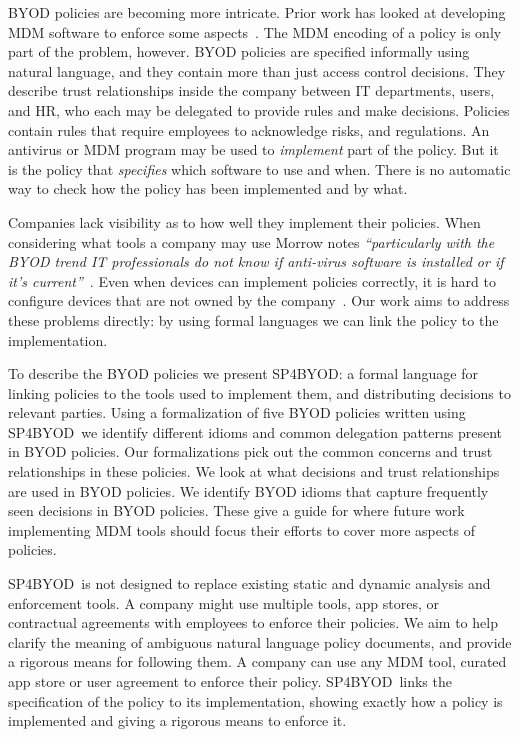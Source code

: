 \documentclass{llncs}
\newcommand{\AppPAL}[0]{SP4BYOD}
\begin{document}
BYOD policies are becoming more intricate.
Prior work has looked at developing \ac{MDM} software to enforce some aspects~\cite{costantino_towards_2013,martinelli_enhancing_2016,armando_enabling_2014}.
The \ac{MDM} encoding of a policy is only part of the problem, however.
BYOD policies are specified informally using natural language, and they contain more than just access control decisions.
They describe trust relationships inside the company between IT departments, users, and HR, who each may be delegated to provide rules and make decisions.
Policies contain rules that require employees to acknowledge risks, and regulations.
An antivirus or \ac{MDM} program may be used to \emph{implement} part of the policy.
But it is the policy that \emph{specifies} which software to use and when. 
There is no automatic way to check how the policy has been implemented and by what.

Companies lack visibility as to how well they implement their policies.
When considering what tools a company may use Morrow notes \emph{``particularly with the BYOD trend IT professionals do not know if anti-virus software is installed or if it's current''}~\cite{morrow_byod_2012}.
Even when devices can implement policies correctly, it is hard to configure devices that are not owned by the company~\cite{tokuyoshi_security_2013}.
Our work aims to address these problems directly: by using formal languages we can link the policy to the implementation.

To describe the BYOD policies we present \AppPAL{}: 
  a formal language for linking policies to the tools used to implement them, and distributing decisions to relevant parties.
Using a formalization of five BYOD policies written using \AppPAL~we identify different idioms and common delegation patterns present in BYOD policies.
Our formalizations pick out the common concerns and trust relationships in these policies.
We look at what decisions and trust relationships are used in BYOD policies.
We identify BYOD idioms that capture frequently seen decisions in BYOD policies.
These give a guide for where future work implementing \ac{MDM} tools should focus their efforts to cover more aspects of policies.

\AppPAL~is not designed to replace existing static and dynamic analysis and enforcement tools.
A company might use multiple tools, app stores, or contractual agreements with employees to enforce their policies.
We aim to help clarify the meaning of ambiguous natural language policy documents, and provide a rigorous means for following them.
A company can use any \ac{MDM} tool, curated app store or user agreement to enforce their policy.
\AppPAL~links the specification of the policy to its implementation, showing exactly how a policy is implemented and giving a rigorous means to enforce it.
\end{document}
